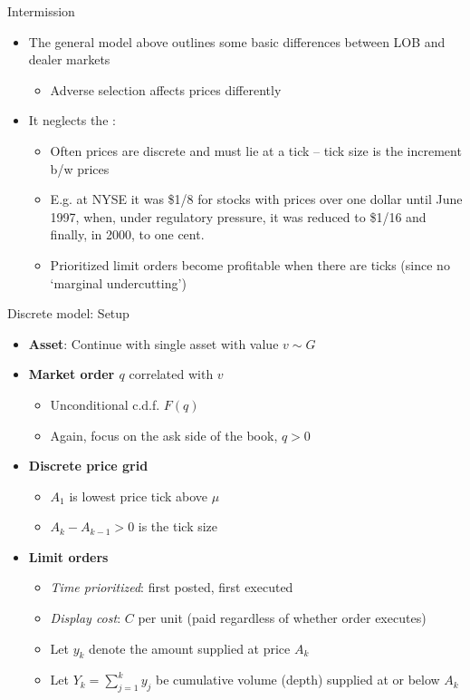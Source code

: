 \documentclass[english,10pt
,aspectratio=169
]{beamer}
\begin{document}
\begin{frame}{Intermission}
	\begin{itemize}
		\item The general model above outlines some basic differences between LOB and dealer markets
		\begin{itemize}
			\item Adverse selection affects prices differently
		\end{itemize}
		\item It neglects the :
		\begin{itemize}
			\item Often prices are discrete and must lie at a tick --  tick size is the increment b/w prices
			\item E.g. at NYSE it was \$1/8 for stocks with prices over one dollar until June 1997, when, under regulatory pressure, it was reduced to \$1/16 and finally, in 2000, to one cent.
			\item Prioritized limit orders become profitable when there are ticks (since no `marginal undercutting')
		\end{itemize}
	\end{itemize}
\end{frame}


\begin{frame}{Discrete model: Setup}
	\begin{itemize}
		\item \textbf{Asset}: Continue with single asset with value $v \sim G$
		\item \textbf{Market order $q$} correlated with $v$
		\begin{itemize}
			\item Unconditional c.d.f. $F(q)$
			\item Again, focus on the ask side of the book, $q>0$
		\end{itemize}
		\item \textbf{Discrete price grid}
		\begin{itemize}
			\item $A_1$ is lowest price tick above $\mu$
			\item $A_k-A_{k-1}>0$ is the tick size
		\end{itemize}
		\item \textbf{Limit orders}
		\begin{itemize}
			\item \textit{Time prioritized}: first posted, first executed
			\item \textit{Display cost}: $C$ per unit (paid regardless of whether order executes)
			\item Let $y_k$ denote the amount supplied at price $A_k$
			\item Let $Y_k=\sum_{j=1}^k y_j$ be cumulative volume (depth) supplied at or below $A_k$
		\end{itemize}
	\end{itemize}
\end{frame}
\end{document}
